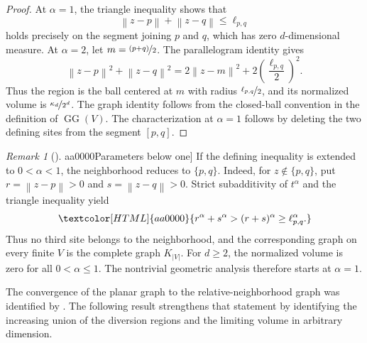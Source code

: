 \documentclass[a4paper,fleqn]{cas-dc}
\theoremstyle{definition}
\theoremstyle{remark}
\newtheorem{remark}{Remark}
\newcommand{\norm}[1]{\left\lVert #1\right\rVert}
\newcommand{\ellpq}{\ell_{p,q}}
\newcommand{\0}{\mathbf{0}}
\newcommand{\tr}[1]{\textcolor[HTML]{aa0000}{#1}}
\DeclareMathOperator{\GG}{GG}
\begin{document}
\begin{proof}
At $\alpha=1$, the triangle inequality shows that
\begin{equation}
\norm{z-p}+\norm{z-q}\leq\ellpq
\end{equation}
holds precisely on the segment joining $p$ and $q$, which has zero
$d$-dimensional measure. At $\alpha=2$, let $m=\nicefrac{(p+q)}{2}$. The parallelogram
identity gives
\begin{equation}
\norm{z-p}^2+\norm{z-q}^2
=
2\norm{z-m}^2+2\left(\frac{\ellpq}{2}\right)^2.
\end{equation}
Thus the region is the ball centered at $m$ with radius $\nicefrac{\ellpq}{2}$, and its
normalized volume is $\nicefrac{\kappa_d}{2^d}$.
The graph identity follows from the closed-ball convention in the
definition of $\GG(V)$. The characterization at $\alpha=1$ follows
by deleting the two defining sites from the segment $[p,q]$.
\end{proof}


\begin{remark}[\tr{Parameters below one}]
\tr{If the defining inequality is extended to $0<\alpha<1$, the
neighborhood reduces to $\{p,q\}$. Indeed, for $z\notin\{p,q\}$,
put $r=\norm{z-p}>0$ and $s=\norm{z-q}>0$. Strict
subadditivity of $t^\alpha$ and the triangle inequality yield}
\begin{equation*}
\tr{r^\alpha+s^\alpha>(r+s)^\alpha\geq\ellpq^\alpha.}
\end{equation*}
\tr{Thus no third site belongs to the neighborhood, and the
corresponding graph on every finite $V$ is the complete graph
$K_{|V|}$. For $d\geq2$, the normalized volume is zero for
all $0<\alpha\leq1$. The nontrivial geometric analysis therefore
starts at $\alpha=1$.}
\end{remark}

The convergence of the planar graph to the relative-neighborhood graph was
identified by \citet[Theorem~3.5]{kannangara2018stepping}. The following
result strengthens that statement by identifying the increasing union of the
diversion regions and the limiting volume in arbitrary dimension.
\end{document}
